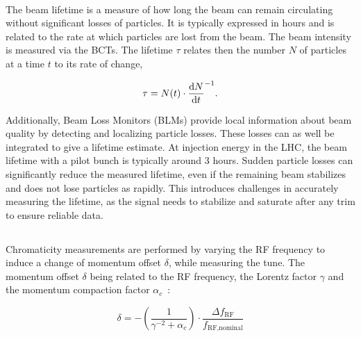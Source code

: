 \paragraph{}

The beam lifetime is a measure of how long the beam can remain circulating without significant
losses of particles. It is typically expressed in hours and is related to the rate
at which particles are lost from the beam. The beam intensity is measured via the BCTs. The lifetime
$\tau$ relates then the number $N$ of particles at a time $t$ to its rate of change,

\begin{equation}
    \tau = N(t) \cdot \frac{\mathop{}\!\mathrm{d} N}{\mathop{}\!\mathrm{d} t}^{-1}.
\end{equation}

Additionally, Beam Loss Monitors (BLMs) provide local information about beam quality by detecting
and localizing particle losses. These losses can as well be integrated to give a lifetime estimate.
At injection energy in the LHC, the beam lifetime with a pilot bunch is typically around 3 hours.
Sudden particle losses can significantly reduce the measured lifetime, even if the remaining beam
stabilizes and does not lose particles as rapidly. This introduces challenges in accurately
measuring the lifetime, as the signal needs to stabilize and saturate after any trim to ensure
reliable data.


\subsection{}
\label{subsection:optics_corrections_chromaticity}


Chromaticity measurements are performed by varying
the RF frequency to induce a change of momentum offset $\delta$, while measuring the tune. The
momentum offset $\delta$ being related to the RF frequency, the Lorentz factor $\gamma$ and the
momentum compaction factor $\alpha_c$~\cite{keintzel_jacqueline_beam_2022}:

\begin{equation}
    \delta = - \left(\frac{1}{\gamma^{-2} + \alpha_c}\right) \cdot \frac{\Delta f_{\text{RF}}}{f_{\text{RF,nominal}}}
    \label{eq:dpp_rf}
\end{equation}

